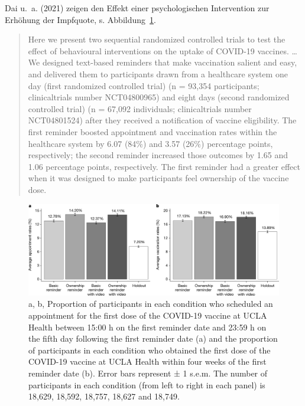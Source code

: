 \documentclass[
  a4paper,
  DIV=11]{scrreprt}
\theoremstyle{definition}
\theoremstyle{remark}
\begin{document}
Dai u.~a. (2021) zeigen den Effekt einer psychologischen Intervention
zur Erhöhung der Impfquote, s. Abbildung~\ref{fig-dai}.

\begin{quote}
Here we present two sequential randomized controlled trials to test the
effect of behavioural interventions on the uptake of COVID-19 vaccines.
\ldots{} We designed text-based reminders that make vaccination salient
and easy, and delivered them to participants drawn from a healthcare
system one day (first randomized controlled trial) (n = 93,354
participants; clinicaltrials number NCT04800965) and eight days (second
randomized controlled trial) (n = 67,092 individuals; clinicaltrials
number NCT04801524) after they received a notification of vaccine
eligibility. The first reminder boosted appointment and vaccination
rates within the healthcare system by 6.07 (84\%) and 3.57 (26\%)
percentage points, respectively; the second reminder increased those
outcomes by 1.65 and 1.06 percentage points, respectively. The first
reminder had a greater effect when it was designed to make participants
feel ownership of the vaccine dose.
\end{quote}

\begin{figure}

{\centering \includegraphics[width=1\textwidth,height=\textheight]{./img/41586_2021_3843_Fig2_HTML.png}

}

\caption{\label{fig-dai}a, b, Proportion of participants in each
condition who scheduled an appointment for the first dose of the
COVID-19 vaccine at UCLA Health between 15:00 h on the first reminder
date and 23:59 h on the fifth day following the first reminder date (a)
and the proportion of participants in each condition who obtained the
first dose of the COVID-19 vaccine at UCLA Health within four weeks of
the first reminder date (b). Error bars represent ± 1 s.e.m. The number
of participants in each condition (from left to right in each panel) is
18,629, 18,592, 18,757, 18,627 and 18,749.}

\end{figure}
\end{document}
